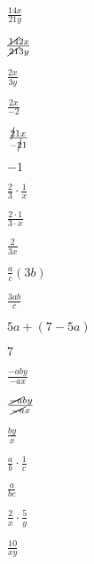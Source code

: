 \documentclass{article}
\begin{document}
\begin{enumerate}[start=28]
    \item $\frac{14x}{21y}$
    \begin{center}
        \item $\frac{\cancel{14}2x}{\cancel{21}3y}$
        \item $\frac{2x}{3y}$
    \end{center}

    \item $\frac{2x}{-2}$
    \begin{center}
        \item $\frac{\cancel{2}1x}{-\cancel{2}1}$
        \item $-1$
    \end{center}

    \item $\frac{2}{3} \cdot \frac{1}{x}$
    \begin{center}
        \item $\frac{2 \cdot 1}{3 \cdot x}$
        \item $\frac{2}{3x}$
    \end{center}

    \item $\frac{a}{c}(3b)$
    \begin{center}
        \item $\frac{3ab}{c}$
    \end{center}

    \item $5a + (7 - 5a)$
    \begin{center}
        \item $7$
    \end{center}

    \item $\frac{-aby}{-ax}$
    \begin{center}
        \item $\frac{\cancel{-a}by}{\cancel{-a}x}$
        \item $\frac{by}{x}$
    \end{center}

    \item $\frac{a}{b} \cdot \frac{1}{c}$
    \begin{center}
        \item $\frac{a}{bc}$
    \end{center}

    \item $\frac{2}{x} \cdot \frac{5}{y}$
    \begin{center}
        \item $\frac{10}{xy}$
    \end{center}


\end{enumerate}
\end{document}
